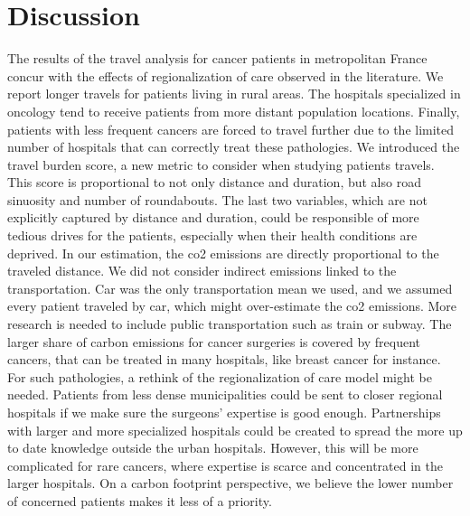 \section{Discussion}

The results of the travel analysis for cancer patients in metropolitan France
concur with the effects of regionalization of care observed in the literature.
We report longer travels for patients living in rural areas. The hospitals
specialized in oncology tend to receive patients from more distant population
locations. Finally, patients with less frequent cancers are forced to travel
further due to the limited number of hospitals that can correctly treat these
pathologies. We introduced the travel burden score, a new metric to consider
when studying patients travels. This score is proportional to not only distance
and duration, but also road sinuosity and number of roundabouts. The last two
variables, which are not explicitly captured by distance and duration, could be
responsible of more tedious drives for the patients, especially when their
health conditions are deprived. In our estimation, the \ac{co2} emissions are
directly proportional to the traveled distance. We did not consider indirect
emissions linked to the transportation. Car was the only transportation mean we
used, and we assumed every patient traveled by car, which might over-estimate
the \ac{co2} emissions. More research is needed to include public transportation
such as train or subway. The larger share of carbon emissions for cancer
surgeries is covered by frequent cancers, that can be treated in many hospitals,
like breast cancer for instance. For such pathologies, a rethink of the
regionalization of care model might be needed. Patients from less dense
municipalities could be sent to closer regional hospitals if we make sure the
surgeons' expertise is good enough. Partnerships with larger and more
specialized hospitals could be created to spread the more up to date knowledge
outside the urban hospitals. However, this will be more complicated for rare
cancers, where expertise is scarce and concentrated in the larger hospitals. On
a carbon footprint perspective, we believe the lower number of concerned
patients makes it less of a priority.
